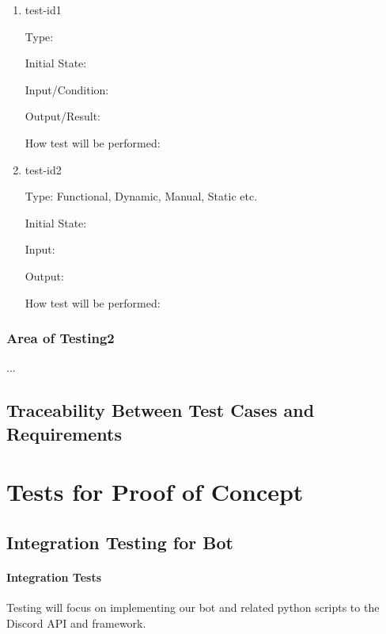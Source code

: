 \documentclass[12pt, titlepage]{article}
\begin{document}
\begin{enumerate}

\item{test-id1\\}

Type: 
					
Initial State: 
					
Input/Condition: 
					
Output/Result: 
					
How test will be performed: 
					
\item{test-id2\\}

Type: Functional, Dynamic, Manual, Static etc.
					
Initial State: 
					
Input: 
					
Output: 
					
How test will be performed: 

\end{enumerate}

\subsubsection{Area of Testing2}

...

\subsection{Traceability Between Test Cases and Requirements}

\section{Tests for Proof of Concept}

\subsection{Integration Testing for Bot}
		
\paragraph{Integration Tests}
Testing will focus on implementing our bot and related python scripts to the Discord API and framework.
\end{document}
